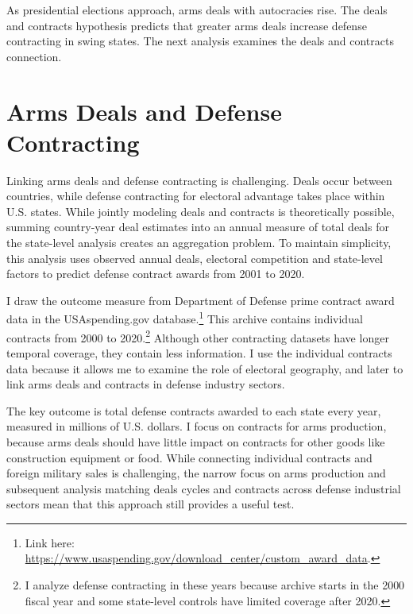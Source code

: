 \documentclass[12pt]{article}
\begin{document}
As presidential elections approach, arms deals with autocracies rise. 
The deals and contracts hypothesis predicts that greater arms deals increase defense contracting in swing states. 
The next analysis examines the deals and contracts connection.


\section{Arms Deals and Defense Contracting}


Linking arms deals and defense contracting is challenging. 
Deals occur between countries, while defense contracting for electoral advantage takes place within U.S. states.
While jointly modeling deals and contracts is theoretically possible, summing country-year deal estimates into an annual measure of total deals for the state-level analysis creates an aggregation problem. %
To maintain simplicity, this analysis uses observed annual deals, electoral competition and state-level factors to predict defense contract awards from 2001 to 2020. 


I draw the outcome measure from Department of Defense prime contract award data in the USAspending.gov database.\footnote{Link here: \url{https://www.usaspending.gov/download_center/custom_award_data}.} 
This archive contains individual contracts from 2000 to 2020.\footnote{I analyze defense contracting in these years because archive starts in the 2000 fiscal year and some state-level controls have limited coverage after 2020.}
Although other contracting datasets have longer temporal coverage, they contain less information.
I use the individual contracts data because it allows me to examine the role of electoral geography, and later to link arms deals and contracts in defense industry sectors. 


The key outcome is total defense contracts awarded to each state every year, measured in millions of U.S. dollars.
I focus on contracts for arms production, because arms deals should have little impact on contracts for other goods like construction equipment or food.
While connecting individual contracts and foreign military sales is challenging, the narrow focus on arms production and subsequent analysis matching deals cycles and contracts across defense industrial sectors mean that this approach still provides a useful test. 
\end{document}
